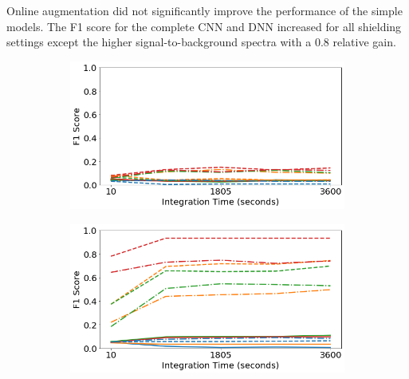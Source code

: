Online augmentation did not significantly improve the performance of the simple models. The F1 score for the complete CNN and DNN increased for all shielding settings except the higher signal-to-background spectra with a 0.8 relative gain.


\begin{figure}[H]
     \centering
     \begin{subfigure}[b]{0.49\textwidth}
         \centering
         \includegraphics[width=\textwidth]{images/generalization-cal-aug-easy-01.png}
         \caption{}
         \label{fig:generalization-cal-aug-easy-01}
     \end{subfigure}
     \hfill
     \begin{subfigure}[b]{0.49\textwidth}
         \centering
         \includegraphics[width=\textwidth]{images/generalization-cal-aug-easy-05.png}
         \caption{}
         \label{fig:generalization-cal-aug-easy-05}
     \end{subfigure}


\end{figure}
